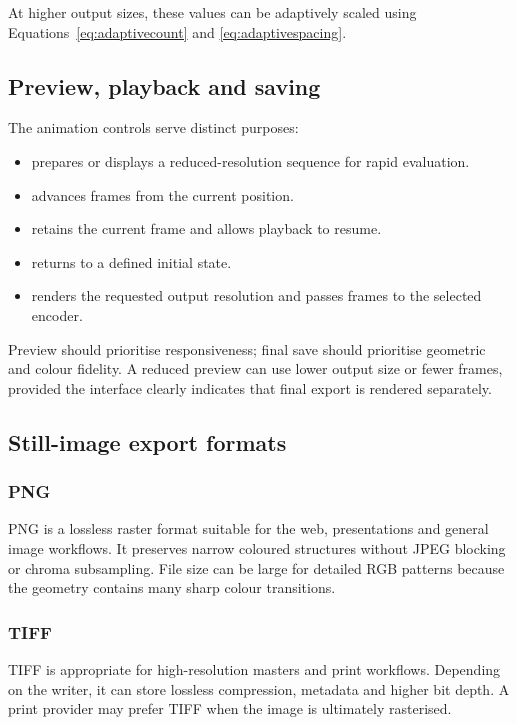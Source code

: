 At higher output sizes, these values can be adaptively scaled using Equations~\eqref{eq:adaptivecount} and \eqref{eq:adaptivespacing}.

\subsection{Preview, playback and saving}

The animation controls serve distinct purposes:

\begin{itemize}
  \item {} prepares or displays a reduced-resolution sequence for rapid evaluation.
  \item {} advances frames from the current position.
  \item {} retains the current frame and allows playback to resume.
  \item {} returns to a defined initial state.
  \item {} renders the requested output resolution and passes frames to the selected encoder.
\end{itemize}

Preview should prioritise responsiveness; final save should prioritise geometric and colour fidelity. A reduced preview can use lower output size or fewer frames, provided the interface clearly indicates that final export is rendered separately.

\subsection{Still-image export formats}

\subsubsection{PNG}

PNG is a lossless raster format suitable for the web, presentations and general image workflows. It preserves narrow coloured structures without JPEG blocking or chroma subsampling. File size can be large for detailed RGB patterns because the geometry contains many sharp colour transitions.

\subsubsection{TIFF}

TIFF is appropriate for high-resolution masters and print workflows. Depending on the writer, it can store lossless compression, metadata and higher bit depth. A print provider may prefer TIFF when the image is ultimately rasterised.

